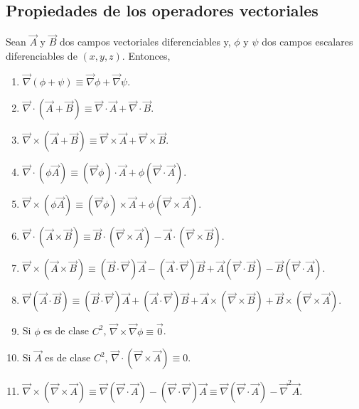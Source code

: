 \subsection{Propiedades de los operadores vectoriales}

\begin{teorema} \label{Prop-Op-Vect}
Sean $\Vec{A}$ y $\Vec{B}$ dos campos vectoriales diferenciables y, $\phi$ y $\psi$ dos campos escalares diferenciables de $(x,y,z)$. Entonces,
\begin{enumerate}
    \item $\Vec{\nabla}(\phi + \psi) \equiv \Vec{\nabla} \phi + \Vec{\nabla} \psi$.

    \item $\Vec{\nabla} \cdot (\vec{A} + \Vec{B}) \equiv \Vec{\nabla} \cdot \Vec{A} + \Vec{\nabla} \cdot \Vec{B}$.

    \item $\Vec{\nabla} \times (\vec{A} + \Vec{B} ) \equiv \Vec{\nabla} \times \Vec{A} + \Vec{\nabla} \times \Vec{B}$.

    \item $\Vec{\nabla} \cdot (\phi \Vec{A}) \equiv (\Vec{\nabla} \phi) \cdot \Vec{A} + \phi (\Vec{\nabla} \cdot \Vec{A})$.

    \item $\Vec{\nabla} \times (\phi \Vec{A}) \equiv (\Vec{\nabla} \phi) \times \Vec{A} + \phi(\Vec{\nabla} \times \Vec{A})$.

    \item $\Vec{\nabla} \cdot (\Vec{A} \times \Vec{B}) \equiv \Vec{B} \cdot (\Vec{\nabla} \times \Vec{A}) - \Vec{A} \cdot (\Vec{\nabla} \times \Vec{B})$.

    \item $\Vec{\nabla} \times (\Vec{A} \times \Vec{B}) \equiv (\Vec{B} \cdot \Vec{\nabla}) \Vec{A} - (\Vec{A} \cdot  \Vec{\nabla}) \Vec{B} + \Vec{A}( \Vec{\nabla} \cdot \Vec{B}) - \Vec{B}( \Vec{\nabla} \cdot \Vec{A})$.

    \item $ \Vec{\nabla}(\Vec{A} \cdot \Vec{B}) \equiv (\Vec{B}  \cdot \Vec{\nabla}) \Vec{A} + (\Vec{A} \cdot  \Vec{\nabla}) \Vec{B} + \Vec{A} \times ( \Vec{\nabla} \times \Vec{B}) + \Vec{B} \times ( \Vec{\nabla} \times \Vec{A})$.

    \item Si $\phi$ es de clase $C^2$, $\vec{\nabla} \times  \Vec{\nabla} \phi \equiv \Vec{0}$.

    \item Si $\Vec{A}$ es de clase $C^2$, $\vec{\nabla} \cdot  (\Vec{\nabla} \times \Vec{A}) \equiv 0$.

    \item $\Vec{\nabla} \times (\Vec{\nabla} \times \Vec{A}) \equiv \Vec{\nabla} (\Vec{\nabla} \cdot \Vec{A}) - (\Vec{\nabla} \cdot \Vec{\nabla}) \Vec{A} \equiv \Vec{\nabla}(\Vec{\nabla} \cdot \Vec{A}) - \Vec{\nabla}^2 \Vec{A}$.
\end{enumerate}
\end{teorema}

